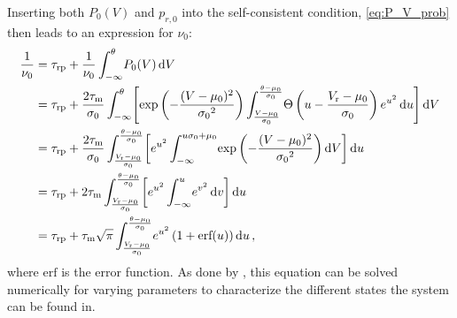 Inserting both $P_0(V)$ and $p_{r, 0}$ into the self-consistent condition, \autoref{eq:P_V_prob}
then leads to an expression for $\nu_0$:
\begin{equation}
    \begin{split}
        \frac{1}{\nu_0} 	
            &= \tau_\text{rp} + \frac{1}{\nu_0} \int_{-\infty}^{\theta} \! P_0(V) \diff V  \\ 
            &= \tau_\text{rp} + \frac{2 \tau_\text{m}}{\sigma_0} 
                \int_{-\infty}^{\theta} \! \left[ 
                    \exp{\left(- \frac{(V - \mu_0)^2}{{\sigma_0}^2} \right)}
                    \int_{\frac{V - \mu_0}{\sigma_0}}^{\frac{\theta - \mu_0}{\sigma_0}} \! 
                        \Theta \left(u - \frac{V_\text{r} - \mu_0}{\sigma_0} \right) e^{u^2} \diff u 
                    \right] \diff V  \\ 
            &= \tau_\text{rp} + \frac{2 \tau_\text{m}}{\sigma_0} 
                \int_{\frac{V_\text{r} - \mu_0}{\sigma_0}}^{\frac{\theta - \mu_0}{\sigma_0}} \! 
                    \left[ 
                        e^{u^2}
                        \int_{-\infty}^{u \sigma_0 + \mu_0} \! 
                        \exp{\left(- \frac{(V - \mu_0)^2}{{\sigma_0}^2} \right)}
                        \diff V
                    \right] \diff u  \\ 
            &= \tau_\text{rp} + 2 \tau_\text{m}
                \int_{\frac{V_\text{r} - \mu_0}{\sigma_0}}^{\frac{\theta - \mu_0}{\sigma_0}} \! 
                    \left[ 
                        e^{u^2}
                        \int_{-\infty}^{u} \! e^{v^2} \diff v
                    \right] \diff u  \\ 
            &= \tau_\text{rp} + \tau_\text{m} \sqrt{\pi}
                \int_{\frac{V_\text{r} - \mu_0}{\sigma_0}}^{\frac{\theta - \mu_0}{\sigma_0}} \! 
                e^{u^2} \left(1 + \text{erf}(u)\right)
                \diff u  \,,
        \label{eq:self_consistency}
    \end{split}
\end{equation}
where $\text{erf}$ is the error function. 
As done by , this equation can be solved numerically for varying parameters to 
characterize the different states the system can be found in.

